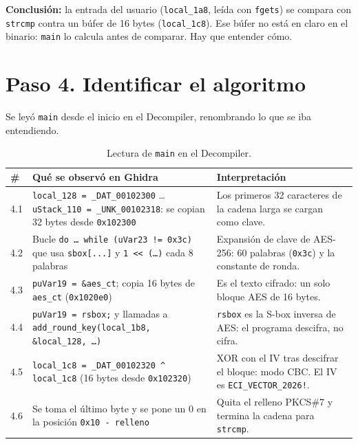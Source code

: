 \documentclass[journal]{IEEEtran}
\begin{document}
\noindent\textbf{Conclusi\'on:} la entrada del usuario (\texttt{local\_\allowbreak{}1a8}, le\'ida
con \texttt{fgets}) se compara con \texttt{strcmp} contra un b\'ufer de 16 bytes
(\texttt{local\_\allowbreak{}1c8}). Ese b\'ufer no est\'a en claro en el binario: \texttt{main}
lo calcula antes de comparar. Hay que entender c\'omo.

\section{Paso 4. Identificar el algoritmo}

Se ley\'o \texttt{main} desde el inicio en el Decompiler, renombrando lo que se
iba entendiendo.

\begin{table}[H]
\centering
\caption{Lectura de \texttt{main} en el Decompiler.}
\footnotesize
\begin{tabular}{@{}l p{1.5in} p{1.3in}@{}}
\hline
\# & Qu\'e se observ\'o en Ghidra & Interpretaci\'on \\ \hline
4.1 & \texttt{local\_\allowbreak{}128 = \_\allowbreak{}DAT\_\allowbreak{}00102300} \ldots{} \texttt{uStack\_\allowbreak{}110 = \_\allowbreak{}UNK\_\allowbreak{}00102318}: se copian 32 bytes desde \texttt{0x102300} & Los primeros 32 caracteres de la cadena larga se cargan como clave. \\
4.2 & Bucle \texttt{do \ldots{} while (uVar23 != 0x3c)} que usa \texttt{sbox[...]} y \texttt{1 << (\ldots)} cada 8 palabras & Expansi\'on de clave de AES-256: 60 palabras (\texttt{0x3c}) y la constante de ronda. \\
4.3 & \texttt{puVar19 = \&aes\_\allowbreak{}ct}; copia 16 bytes de \texttt{aes\_\allowbreak{}ct} (\texttt{0x1020e0}) & Es el texto cifrado: un solo bloque AES de 16 bytes. \\
4.4 & \texttt{puVar19 = rsbox;} y llamadas a \texttt{add\_\allowbreak{}round\_\allowbreak{}key(local\_\allowbreak{}1b8, \&local\_\allowbreak{}128, \ldots)} & \texttt{rsbox} es la S-box inversa de AES: el programa descifra, no cifra. \\
4.5 & \texttt{local\_\allowbreak{}1c8 = \_\allowbreak{}DAT\_\allowbreak{}00102320 \^{} local\_\allowbreak{}1c8} (16 bytes desde \texttt{0x102320}) & XOR con el IV tras descifrar el bloque: modo CBC. El IV es \texttt{ECI\_\allowbreak{}VECTOR\_\allowbreak{}2026!}. \\
4.6 & Se toma el \'ultimo byte y se pone un 0 en la posici\'on \texttt{0x10 - relleno} & Quita el relleno PKCS\#7 y termina la cadena para \texttt{strcmp}. \\ \hline
\end{tabular}
\end{table}
\end{document}
